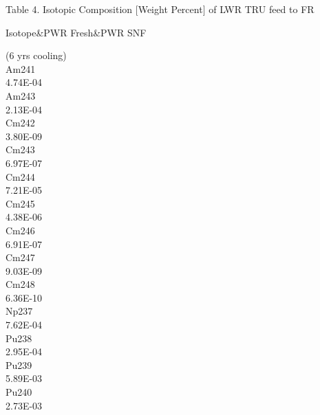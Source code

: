 Table 4.  Isotopic Composition $[$Weight Percent$]$ of LWR TRU feed to
FR

Isotope&PWR Fresh&PWR SNF 

(6 yrs cooling)\\

Am241\\

4.74E-04\\

Am243\\

2.13E-04\\

Cm242\\

3.80E-09\\

Cm243\\

6.97E-07\\

Cm244\\

7.21E-05\\

Cm245\\

4.38E-06\\

Cm246\\

6.91E-07\\

Cm247\\

9.03E-09\\

Cm248\\

6.36E-10\\

Np237\\

7.62E-04\\

Pu238\\

2.95E-04\\

Pu239\\

5.89E-03\\

Pu240\\

2.73E-03\\

